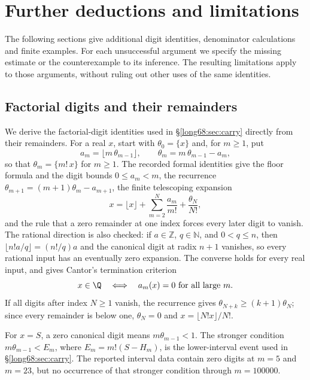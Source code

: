 \section{Further deductions and limitations}\label{long68:sec:extended-record}

The following sections give additional digit identities, denominator
calculations and finite examples. For each unsuccessful argument we
specify the missing estimate or the counterexample to its inference.
The resulting limitations apply to those arguments, without ruling out
other uses of the same identities.

\subsection{Factorial digits and their remainders}\label{long68:sec:ext-digits}

We derive the factorial-digit identities used in
\S\ref{long68:sec:carry} directly from their remainders. For a real
$x$, start with $\theta_0=\{x\}$ and, for $m\ge1$, put
\[
 a_m=\lfloor m\,\theta_{m-1}\rfloor,\qquad \theta_m=m\,\theta_{m-1}-a_m ,
\]
so that $\theta_m=\{m!\,x\}$ for $m\ge1$.  The recorded formal identities give the floor
formula and the digit bounds $0\le a_m<m$, the recurrence
$\theta_{m+1}=(m+1)\theta_m-a_{m+1}$, the finite telescoping expansion
\[
 x=\lfloor x\rfloor+\sum_{m=2}^{N}\frac{a_m}{m!}+\frac{\theta_N}{N!},
\]
and the rule that a zero remainder at one index forces every later digit to
vanish.  The rational direction is also checked: if $a\in\mathbb Z$, $q\in\mathbb N$, and $0<q\le n$, then
$\lfloor n!a/q\rfloor=(n!/q)a$ and the canonical digit at
radix $n+1$ vanishes, so every rational input has an eventually zero
expansion.  The converse holds for every real input, and gives Cantor's
termination criterion \cite{cantor1869}
\[
 x\in\Q\quad\Longleftrightarrow\quad a_m(x)=0\ \hbox{for all large }m .
\]
If all digits after index $N\ge1$ vanish, the recurrence gives
$\theta_{N+k}\ge(k+1)\theta_N$; since every remainder is below one,
$\theta_N=0$ and $x=\lfloor N!x\rfloor/N!$.

For $x=S$, a zero canonical digit means $m\theta_{m-1}<1$. The
stronger condition $m\theta_{m-1}<E_m$, where $E_m=m!(S-H_m)$, is the
lower-interval event used in \S\ref{long68:sec:carry}. The reported interval
data contain zero digits at $m=5$ and $m=23$, but no occurrence of that
stronger condition through $m=100000$.

